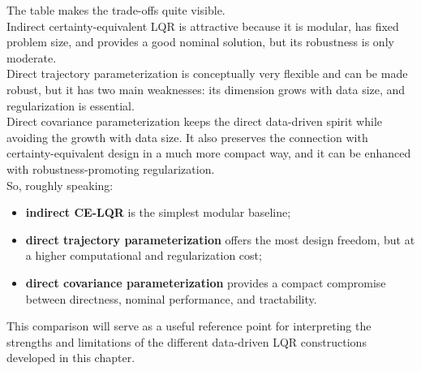 The table makes the trade-offs quite visible.\\
Indirect certainty-equivalent LQR is attractive because it is modular, has fixed problem size,
and provides a good nominal solution, but its robustness is only moderate.\\
Direct trajectory parameterization is conceptually very flexible and can be made robust, but it
has two main weaknesses: its dimension grows with data size, and regularization is essential.\\
Direct covariance parameterization keeps the direct data-driven spirit while avoiding the growth
with data size. It also preserves the connection with certainty-equivalent design in a much more
compact way, and it can be enhanced with robustness-promoting regularization.\\

So, roughly speaking:
\begin{itemize}
    \item \textbf{indirect CE-LQR} is the simplest modular baseline;
    \item \textbf{direct trajectory parameterization} offers the most design freedom, but at a higher
    computational and regularization cost;
    \item \textbf{direct covariance parameterization} provides a compact compromise between directness,
    nominal performance, and tractability.
\end{itemize}
This comparison will serve as a useful reference point for interpreting the strengths and
limitations of the different data-driven LQR constructions developed in this chapter.